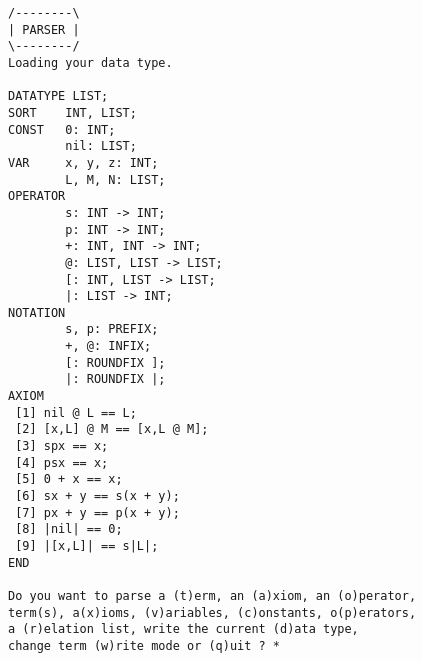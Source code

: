 \begin{verbatim}
/--------\
| PARSER |
\--------/
Loading your data type.
 
DATATYPE LIST;
SORT    INT, LIST;
CONST   0: INT;
        nil: LIST;
VAR     x, y, z: INT;
        L, M, N: LIST;
OPERATOR
        s: INT -> INT;
        p: INT -> INT;
        +: INT, INT -> INT;
        @: LIST, LIST -> LIST;
        [: INT, LIST -> LIST;
        |: LIST -> INT;
NOTATION
        s, p: PREFIX;
        +, @: INFIX;
        [: ROUNDFIX ];
        |: ROUNDFIX |;
AXIOM
 [1] nil @ L == L;
 [2] [x,L] @ M == [x,L @ M];
 [3] spx == x;
 [4] psx == x;
 [5] 0 + x == x;
 [6] sx + y == s(x + y);
 [7] px + y == p(x + y);
 [8] |nil| == 0;
 [9] |[x,L]| == s|L|;
END
 
Do you want to parse a (t)erm, an (a)xiom, an (o)perator,
term(s), a(x)ioms, (v)ariables, (c)onstants, o(p)erators,
a (r)elation list, write the current (d)ata type,
change term (w)rite mode or (q)uit ? *
\end{verbatim}
